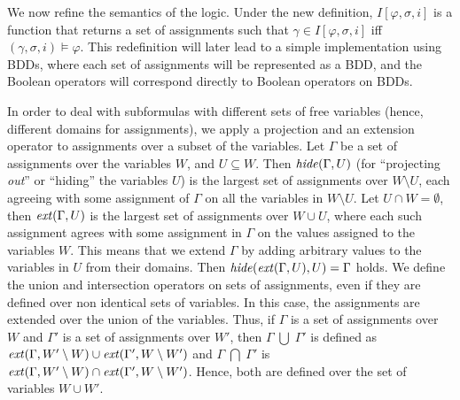 \iffalse
{}
We now refine the semantics of the logic. Under the new definition, 
$I [ \varphi , \sigma, i ]$ is a function that returns
a set of assignments such that $\gamma \in I [ \varphi , \sigma, i ]$ 
iff $( \gamma , \sigma , i ) \models \varphi$.
This redefinition will later lead to a simple implementation 
using BDDs, where each set of assignments will be represented
as a BDD, and the Boolean operators will correspond directly 
to Boolean operators on BDDs.

In order to deal with subformulas with different sets of free
variables (hence, different domains for assignments), 
we apply a projection and an extension operator to assignments
over a subset of the variables. Let $\Gamma$ be
a set of assignments over the variables $W$, and
$U \subseteq W$.
Then $\mathit{hide} ( \Gamma , U )$ (for ``projecting {\em out}'' or  ``hiding''
the variables $U$)
is the largest set of assignments over 
$W \setminus U$, 
each agreeing with some
assignment of $\Gamma$ on all the variables in $W \setminus U$.
Let $U \cap W = \emptyset$, then
$\mathit{ext} ( \Gamma , U )$ is the largest set of assignments
over $W \cup U$, where each such assignment agrees 
with some assignment in $\Gamma$ on the
values assigned to the variables $W$. 
This means that we extend $\Gamma$ by
adding arbitrary values to the variables in $U$ from their domains.
Then $\mathit{hide} ( \mathit{ext} ( \Gamma , U ) , U ) = \Gamma$ holds.
We define the union and intersection operators on sets of
assignments, even if they are defined over non identical
sets of variables. 
In this case, the assignments are extended
over the union of the variables. Thus, if $\Gamma$ is a
set of assignments over $W$ and $\Gamma'$ is
a set of assignments over $W'$, then
$\Gamma \; \bigcup \;  \Gamma'$ is defined as $\mathit{ext} (\Gamma , W' \setminus W ) \cup
\mathit{ext} ( \Gamma' , W \setminus W' )$ and
$\Gamma \; \bigcap \; \Gamma'$ is $\mathit{ext} (\Gamma , W' \setminus W ) \cap
\mathit{ext} ( \Gamma' , W \setminus W' )$.  Hence, both are defined
over the set of variables $W \cup W'$.



